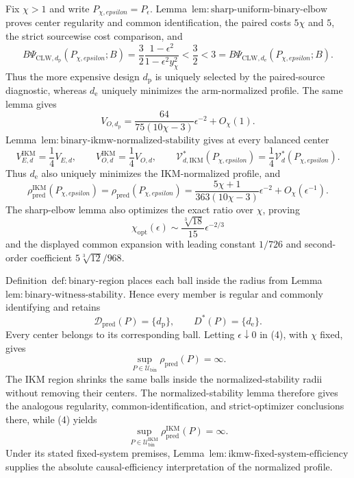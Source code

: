 Fix \(\chi>1\) and write \(P_{\chi,epsilon}=P_\epsilon\).  Lemma~\(\mathrm{lem{:}sharp\text{-}uniform\text{-}binary\text{-}elbow}\) proves center regularity and common identification, the paired costs \(5\chi\) and \(5\), the strict sourcewise cost comparison, and
\[
 B\Psi_{\mathrm{CLW},d_{\mathrm p}}(P_{\chi,epsilon};B)
 =\frac32\frac{1-\epsilon^2}{1-\epsilon^2y_\chi^2}
 <\frac32<3
 =B\Psi_{\mathrm{CLW},d_{\mathrm e}}(P_{\chi,epsilon};B). \tag{1}
\]
Thus the more expensive design \(d_{\mathrm p}\) is uniquely selected by the paired-source diagnostic, whereas \(d_{\mathrm e}\) uniquely minimizes the arm-normalized profile.  The same lemma gives
\[
 V_{O,d_{\mathrm p}}
 =\frac{64}{75(10\chi-3)}\epsilon^{-2}+O_\chi(1). \tag{2}
\]
Lemma~\(\mathrm{lem{:}binary\text{-}ikmw\text{-}normalized\text{-}stability}\) gives at every balanced center
\[
 V_{E,d}^{\mathrm{IKM}}=\frac14V_{E,d},
 \qquad V_{O,d}^{\mathrm{IKM}}=\frac14V_{O,d},
 \qquad \mathcal V_{d,\mathrm{IKM}}^*(P_{\chi,epsilon})
 =\frac14\mathcal V_d^*(P_{\chi,epsilon}). \tag{3}
\]
Thus \(d_{\mathrm e}\) also uniquely minimizes the IKM-normalized profile, and
\[
 \rho_{\mathrm{pred}}^{\mathrm{IKM}}(P_{\chi,epsilon})
 =\rho_{\mathrm{pred}}(P_{\chi,epsilon})
 =\frac{5\chi+1}{363(10\chi-3)}\epsilon^{-2}
 +O_\chi(\epsilon^{-1}). \tag{4}
\]
The sharp-elbow lemma also optimizes the exact ratio over \(\chi\), proving
\[
 \chi_{\mathrm{opt}}(\epsilon)
 \sim\frac{\sqrt[3]{18}}{15}\epsilon^{-2/3}
\]
and the displayed common expansion with leading constant \(1/726\) and second-order coefficient \(5\sqrt[3]{12}/968\).

Definition~\(\mathrm{def{:}binary\text{-}region}\) places each ball inside the radius from Lemma~\(\mathrm{lem{:}binary\text{-}witness\text{-}stability}\).  Hence every member is regular and commonly identifying and retains
\[
 \mathcal D_{\mathrm{pred}}(P)=\{d_{\mathrm p}\},
 \qquad D^*(P)=\{d_{\mathrm e}\}.
\]
Every center belongs to its corresponding ball.  Letting \(\epsilon\downarrow0\) in (4), with \(\chi\) fixed, gives
\[
 \sup_{P\in\mathcal U_{\mathrm{bin}}}\rho_{\mathrm{pred}}(P)=\infty. \tag{5}
\]
The IKM region shrinks the same balls inside the normalized-stability radii without removing their centers.  The normalized-stability lemma therefore gives the analogous regularity, common-identification, and strict-optimizer conclusions there, while (4) yields
\[
 \sup_{P\in\mathcal U_{\mathrm{bin}}^{\mathrm{IKM}}}
 \rho_{\mathrm{pred}}^{\mathrm{IKM}}(P)=\infty. \tag{6}
\]
Under its stated fixed-system premises, Lemma~\(\mathrm{lem{:}ikmw\text{-}fixed\text{-}system\text{-}efficiency}\) supplies the absolute causal-efficiency interpretation of the normalized profile.

